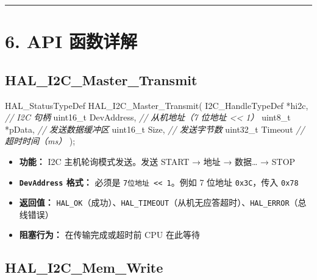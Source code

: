 \documentclass[
  chinese,
  UTF8,
  oneside,
  openany]{ctexbook}
\newenvironment{Shaded}{}{}
\newcommand{\CommentTok}[1]{\textcolor[rgb]{0.38,0.63,0.69}{\textit{#1}}}
\newcommand{\DataTypeTok}[1]{\textcolor[rgb]{0.56,0.13,0.00}{#1}}
\newcommand{\NormalTok}[1]{#1}
\newcommand{\OperatorTok}[1]{\textcolor[rgb]{0.40,0.40,0.40}{#1}}
\providecommand{\tightlist}{%
  \setlength{\itemsep}{0pt}\setlength{\parskip}{0pt}}
\begin{document}
\begin{center}\rule{0.5\linewidth}{0.5pt}\end{center}

\section{6. API 函数详解}\label{api-ux51fdux6570ux8be6ux89e3-2}

\subsection{HAL\_I2C\_Master\_Transmit}\label{hal_i2c_master_transmit}

\begin{Shaded}
\begin{Highlighting}[]
\NormalTok{HAL\_StatusTypeDef HAL\_I2C\_Master\_Transmit}\OperatorTok{(}
\NormalTok{    I2C\_HandleTypeDef }\OperatorTok{*}\NormalTok{hi2c}\OperatorTok{,}    \CommentTok{// I2C 句柄}
    \DataTypeTok{uint16\_t}\NormalTok{           DevAddress}\OperatorTok{,} \CommentTok{// 从机地址（7 位地址 \textless{}\textless{} 1）}
    \DataTypeTok{uint8\_t}           \OperatorTok{*}\NormalTok{pData}\OperatorTok{,}     \CommentTok{// 发送数据缓冲区}
    \DataTypeTok{uint16\_t}\NormalTok{           Size}\OperatorTok{,}      \CommentTok{// 发送字节数}
    \DataTypeTok{uint32\_t}\NormalTok{           Timeout    }\CommentTok{// 超时时间（ms）}
\OperatorTok{);}
\end{Highlighting}
\end{Shaded}

\begin{itemize}
\tightlist
\item
  \textbf{功能：} I2C 主机轮询模式发送。发送 START → 地址 → 数据\ldots{}
  → STOP
\item
  \textbf{\texttt{DevAddress} 格式：} 必须是
  \texttt{7位地址\ \textless{}\textless{}\ 1}。例如 7 位地址
  \texttt{0x3C}，传入 \texttt{0x78}
\item
  \textbf{返回值：}
  \texttt{HAL\_OK}（成功）、\texttt{HAL\_TIMEOUT}（从机无应答超时）、\texttt{HAL\_ERROR}（总线错误）
\item
  \textbf{阻塞行为：} 在传输完成或超时前 CPU 在此等待
\end{itemize}

\subsection{HAL\_I2C\_Mem\_Write}\label{hal_i2c_mem_write}
\end{document}
